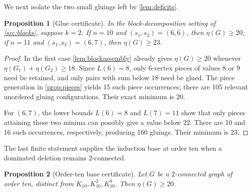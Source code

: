 \documentclass[11pt,reqno]{amsart}
\newtheorem{proposition}[proposition]{Proposition}
\theoremstyle{definition}
\theoremstyle{remark}
\begin{document}
We next isolate the two small gluings left by \cref{lem:deficits}.

\begin{proposition}[Glue certificate]\label{prop:glue}
In the block-decomposition setting of \cref{sec:blocks}, suppose $k=2$.
If $n=10$ and $(s_1,s_2)=(6,6)$, then $\eta(G)\ge20$; if $n=11$ and
$(s_1,s_2)=(6,7)$, then $\eta(G)\ge23$.
\end{proposition}

\begin{proof}
In the first case \cref{lem:blockassembly} already gives $\eta(G)\ge20$
whenever $\eta(G_1)+\eta(G_2)\ge18$.  Since $L(6)=8$, only $6$-vertex pieces
of values $8$ or $9$ need be retained, and only pairs with sum below $18$
need be glued.  The piece generation in \cref{prop:pieces} yields 15 such
piece occurrences; there are 105 relevant unordered gluing configurations.
Their exact minimum is $20$.

For $(6,7)$, the lower bounds $L(6)=8$ and $L(7)=11$ show that only pieces
attaining these two minima can possibly give a value below $22$.  There are
10 and 16 such occurrences, respectively, producing 160 gluings.  Their
minimum is $23$.
\end{proof}

The last finite statement supplies the induction base at order ten when a
dominated deletion remains $2$-connected.

\begin{proposition}[Order-ten base certificate]\label{prop:base10}
Let $G$ be a $2$-connected graph of order ten, distinct from
$K_{10},K_{10}^2,K_{10}^8$.  Then $\eta(G)\ge20$.
\end{proposition}
\end{document}
